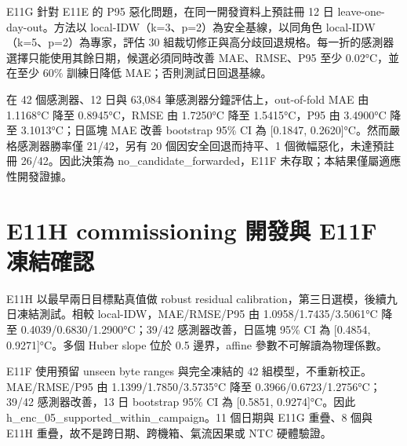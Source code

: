 \documentclass[12pt,a4paper]{article}
\begin{document}
E11G 針對 E11E 的 P95 惡化問題，在同一開發資料上預註冊 12 日 leave-one-day-out。方法以 local-IDW（k=3、p=2）為安全基線，以同角色 local-IDW（k=5、p=2）為專家，評估 30 組裁切修正與高分歧回退規格。每一折的感測器選擇只能使用其餘日期，候選必須同時改善 MAE、RMSE、P95 至少 0.02°C，並在至少 60\% 訓練日降低 MAE；否則測試日回退基線。


在 42 個感測器、12 日與 63,084 筆感測器分鐘評估上，out-of-fold MAE 由 1.1168°C 降至 0.8945°C，RMSE 由 1.7250°C 降至 1.5415°C，P95 由 3.4900°C 降至 3.1013°C；日區塊 MAE 改善 bootstrap 95\% CI 為 [0.1847, 0.2620]°C。然而嚴格感測器勝率僅 21/42，另有 20 個因安全回退而持平、1 個微幅惡化，未達預註冊 26/42。因此決策為 no\_\allowbreak{}candidate\_\allowbreak{}forwarded，E11F 未存取；本結果僅屬適應性開發證據。


\section*{E11H commissioning 開發與 E11F 凍結確認}

E11H 以最早兩日目標點真值做 robust residual calibration，第三日選模，後續九日凍結測試。相較 local-IDW，MAE/RMSE/P95 由 1.0958/1.7435/3.5061°C 降至 0.4039/0.6830/1.2900°C；39/42 感測器改善，日區塊 95\% CI 為 [0.4854, 0.9271]°C。多個 Huber slope 位於 0.5 邊界，affine 參數不可解讀為物理係數。


E11F 使用預留 unseen byte ranges 與完全凍結的 42 組模型，不重新校正。MAE/RMSE/P95 由 1.1399/1.7850/3.5735°C 降至 0.3966/0.6723/1.2756°C；39/42 感測器改善，13 日 bootstrap 95\% CI 為 [0.5851, 0.9274]°C。因此 h\_\allowbreak{}enc\_\allowbreak{}05\_\allowbreak{}supported\_\allowbreak{}within\_\allowbreak{}campaign。11 個日期與 E11G 重疊、8 個與 E11H 重疊，故不是跨日期、跨機箱、氣流因果或 NTC 硬體驗證。
\end{document}

